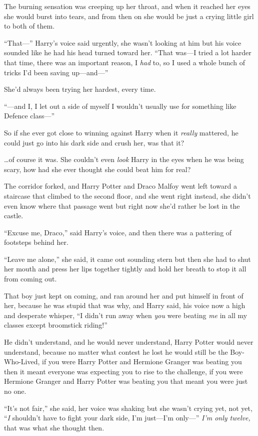 The burning sensation was creeping up her throat, and when it reached her eyes she would burst into tears, and from then on she would be just a crying little girl to both of them.

“That—” Harry’s voice said urgently, she wasn’t looking at him but his voice sounded like he had his head turned toward her. “That was—I tried a lot harder that time, there was an important reason, I \emph{had} to, so I used a whole bunch of tricks I’d been saving up—and—”

She’d always been trying her hardest, every time.

“—and I, I let out a side of myself I wouldn’t usually use for something like Defence class—”

So if she ever got close to winning against Harry when it \emph{really} mattered, he could just go into his dark side and crush her, was that it?

…of course it was. She couldn’t even \emph{look} Harry in the eyes when he was being scary, how had she ever thought she could beat him for real?

The corridor forked, and Harry Potter and Draco Malfoy went left toward a staircase that climbed to the second floor, and she went right instead, she didn’t even know where that passage went but right now she’d rather be lost in the castle.

“Excuse me, Draco,” said Harry’s voice, and then there was a pattering of footsteps behind her.

“Leave me alone,” she said, it came out sounding stern but then she had to shut her mouth and press her lips together tightly and hold her breath to stop it all from coming out.

That boy just kept on coming, and ran around her and put himself in front of her, because he was stupid that was why, and Harry said, his voice now a high and desperate whisper, “I didn’t run away when \emph{you} were beating \emph{me} in all my classes except broomstick riding!”

He didn’t understand, and he would never understand, Harry Potter would never understand, because no matter what contest he lost he would still be the Boy-Who-Lived, if you were Harry Potter and Hermione Granger was beating you then it meant everyone was expecting you to rise to the challenge, if you were Hermione Granger and Harry Potter was beating you that meant you were just no one.

“It’s not fair,” she said, her voice was shaking but she wasn’t crying yet, not yet, “\emph{I} shouldn’t have to fight your dark side, I’m just—I’m only—” \emph{I’m only twelve,} that was what she thought then.

